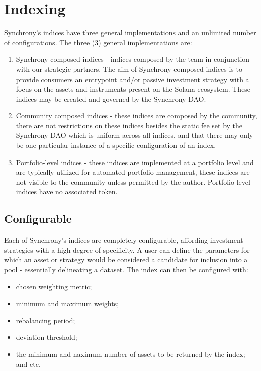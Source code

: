 \documentclass[10pt]{article}
\begin{document}
					\section{Indexing}
					Synchrony's indices have three general implementations and an unlimited number
					of configurations. The three (3) general implementations are:
					\begin{enumerate}
						\item Synchrony composed indices - indices composed by the team in
							conjunction with our strategic partners. The aim of Synchrony composed
							indices is to provide consumers an entrypoint and/or passive investment
							strategy with a focus on the assets and instruments present on the
							Solana ecosystem. These indices may be created and governed by the
							Synchrony DAO.
						\item Community composed indices - these indices are composed by the
							community, there are not restrictions on these indices besides the
							static fee set by the Synchrony DAO which is uniform across all indices,
							and that there may only be one particular instance of a specific
							configuration of an index.
						\item Portfolio-level indices - these indices are implemented at a portfolio
							level and are typically utilized for automated portfolio management,
							these indices are not visible to the community unless permitted by the
							author. Portfolio-level indices have no associated token.
					\end{enumerate}

					\subsection{Configurable}
					Each of Synchrony's indices are completely configurable, affording investment
					strategies with a high degree of specificity. A user can define the parameters
					for which an asset or strategy would be considered a candidate for inclusion
					into a pool - essentially delineating a dataset. The index can then be
					configured with:
					\begin{itemize}
						\item chosen weighting metric; 
						\item minimum and maximum weights;
						\item rebalancing period; 
						\item deviation threshold; 
						\item the minimum and naximum number of assets to be returned by the index;
							and etc.
					\end{itemize}
\end{document}
